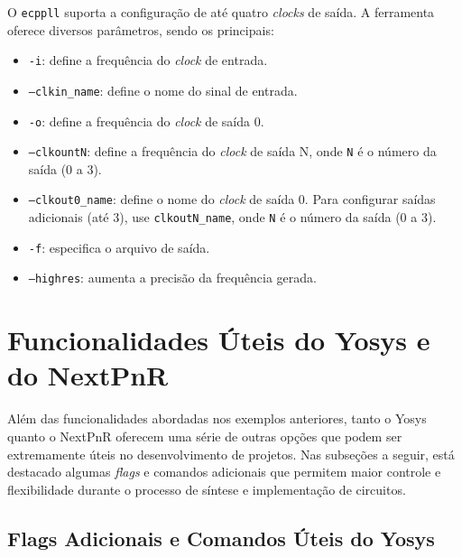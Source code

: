 \documentclass{report}
\begin{document}
O \texttt{ecppll} suporta a configuração de até quatro \textit{clocks} de saída. A ferramenta oferece diversos parâmetros, sendo os principais:

\begin{itemize}
    \item \texttt{-i}: define a frequência do \textit{clock} de entrada.
    \item \texttt{--clkin\_name}: define o nome do sinal de entrada.
    \item \texttt{-o}: define a frequência do \textit{clock} de saída 0.
    \item \texttt{--clkountN}: define a frequência do \textit{clock} de saída N, onde \texttt{N} é o número da saída (0 a 3).
    \item \texttt{--clkout0\_name}: define o nome do \textit{clock} de saída 0. Para configurar saídas adicionais (até 3), use \texttt{clkoutN\_name}, onde \texttt{N} é o número da saída (0 a 3).
    \item \texttt{-f}: especifica o arquivo de saída.
    \item \texttt{--highres}: aumenta a precisão da frequência gerada.
\end{itemize}

\section{Funcionalidades Úteis do Yosys e do NextPnR}

Além das funcionalidades abordadas nos exemplos anteriores, tanto o Yosys quanto o NextPnR oferecem uma série de outras opções que podem ser extremamente úteis no desenvolvimento de projetos. Nas subseções a seguir, está  destacado algumas \textit{flags} e comandos adicionais que permitem maior controle e flexibilidade durante o processo de síntese e implementação de circuitos.

\subsection{Flags Adicionais e Comandos Úteis do Yosys}
\end{document}
